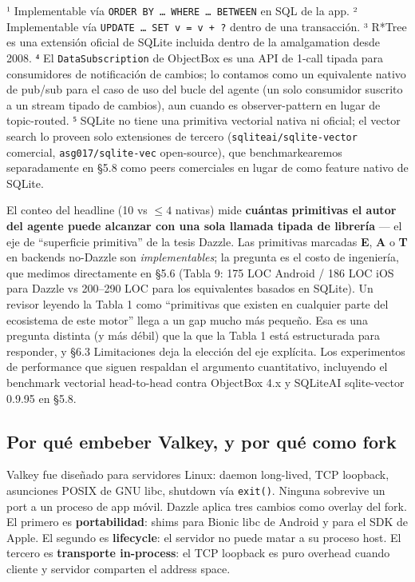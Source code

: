 ¹ Implementable vía \texttt{ORDER\ BY\ …\ WHERE\ …\ BETWEEN} en SQL de la app. ²
Implementable vía \texttt{UPDATE\ …\ SET\ v\ =\ v\ +\ ?} dentro de una
transacción. ³ R*Tree es una extensión oficial de SQLite incluida dentro de la
amalgamation desde 2008. ⁴ El \texttt{DataSubscription} de ObjectBox es una API
de 1-call tipada para consumidores de notificación de cambios; lo contamos como
un equivalente nativo de pub/sub para el caso de uso del bucle del agente (un
solo consumidor suscrito a un stream tipado de cambios), aun cuando es
observer-pattern en lugar de topic-routed. ⁵ SQLite no tiene una primitiva
vectorial nativa ni oficial; el vector search lo proveen solo extensiones de
tercero (\texttt{sqliteai/sqlite-vector} comercial, \texttt{asg017/sqlite-vec}
open-source), que benchmarkearemos separadamente en §5.8 como peers comerciales
en lugar de como feature nativo de SQLite.

El conteo del headline (10 vs \(\leq 4\) nativas) mide \textbf{cuántas
primitivas el autor del agente puede alcanzar con una sola llamada tipada de
librería} --- el eje de ``superficie primitiva'' de la tesis Dazzle. Las
primitivas marcadas \textbf{E}, \textbf{A} o \textbf{T} en backends no-Dazzle
son \emph{implementables}; la pregunta es el costo de ingeniería, que medimos
directamente en §5.6 (Tabla 9: 175 LOC Android / 186 LOC iOS para Dazzle vs
200--290 LOC para los equivalentes basados en SQLite). Un revisor leyendo la
Tabla 1 como ``primitivas que existen en cualquier parte del ecosistema de este
motor'' llega a un gap mucho más pequeño. Esa es una pregunta distinta (y más
débil) que la que la Tabla 1 está estructurada para responder, y §6.3
Limitaciones deja la elección del eje explícita. Los experimentos de performance
que siguen respaldan el argumento cuantitativo, incluyendo el benchmark
vectorial head-to-head contra ObjectBox 4.x y SQLiteAI sqlite-vector 0.9.95 en
§5.8.

\subsection{Por qué embeber Valkey, y por qué como
fork}\label{por-quuxe9-embeber-valkey-y-por-quuxe9-como-fork}

Valkey fue diseñado para servidores Linux: daemon long-lived, TCP loopback,
asunciones POSIX de GNU libc, shutdown vía \texttt{exit()}. Ninguna sobrevive un
port a un proceso de app móvil. Dazzle aplica tres cambios como overlay del
fork. El primero es \textbf{portabilidad}: shims para Bionic libc de Android y
para el SDK de Apple. El segundo es \textbf{lifecycle}: el servidor no puede
matar a su proceso host. El tercero es \textbf{transporte in-process}: el TCP
loopback es puro overhead cuando cliente y servidor comparten el address space.

